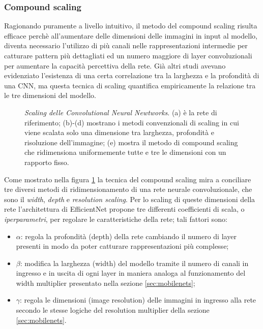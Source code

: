 
\subsubsection{Compound scaling}

Ragionando puramente a livello intuitivo, il metodo del compound scaling risulta efficace perchè all'aumentare delle dimensioni delle immagini in input al modello, diventa necessario l'utilizzo di più canali nelle rappresentazioni intermedie per catturare pattern più dettagliati ed un numero maggiore di layer convoluzionali per aumentare la capacità percettiva della rete. Già altri studi avevano evidenziato l'esistenza di una certa correlazione tra la larghezza e la profondità di una CNN, ma questa tecnica di scaling quantifica empiricamente la relazione tra le tre dimensioni del modello.

\begin{figure}[ht!]
    \centering
    \caption{\textit{Scaling delle Convolutional Neural Newtworks}. (a) è la rete di riferimento; (b)-(d) mostrano i metodi convenzionali di scaling in cui viene scalata solo una dimensione tra larghezza, profondità e risoluzione dell'immagine; (e) mostra il metodo di compound scaling che ridimensiona uniformemente tutte e tre le dimensioni con un rapporto fisso.}
    \label{fig:scaling}
\end{figure}

Come mostrato nella figura \ref{fig:scaling} la tecnica del compound scaling mira a conciliare tre diversi metodi di ridimensionamento di una rete neurale convoluzionale, che sono il \textit{width}, \textit{depth} e \textit{resolution scaling}. 
Per lo scaling di queste dimensioni della rete l'architettura di EfficientNet propone tre differenti coefficienti di scala, o \textit{iperparametri}, per regolare le caratteristiche della rete; tali fattori sono:
\begin{itemize}
    \item $\alpha$: regola la profondità (depth) della rete cambiando il numero di layer presenti in modo da poter catturare rappresentazioni più complesse;
    \item $\beta$: modifica la larghezza (width) del modello tramite il numero di canali in ingresso e in uscita di ogni layer in maniera analoga al funzionamento del width multiplier presentato nella sezione \ref{sec:mobilenets};
    \item $\gamma$: regola le dimensioni (image resolution) delle immagini in ingresso alla rete secondo le stesse logiche del resolution multiplier della sezione \ref{sec:mobilenets}.
\end{itemize}

